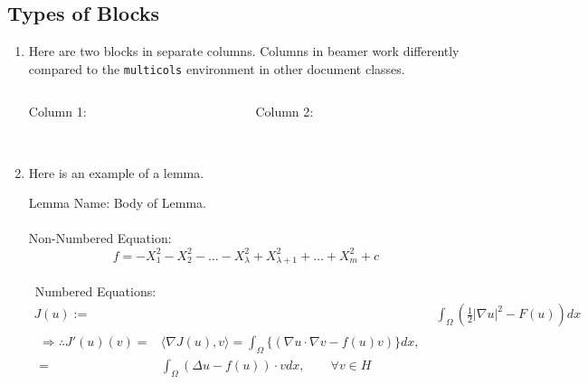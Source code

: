 \subsection{Types of Blocks}
\begin{frame}[fragile]
\begin{enumerate}
    \item Here are two blocks in separate columns. Columns in beamer work differently compared to the \verb+multicols+ environment in other document classes.
    \begin{columns}
    \begin{column}{0.48\textwidth}
    \begin{block}{Column 1:}
    {\gray \lipsum[2][1-6]}
\\~\ %
    \end{block}
    \end{column}
    \begin{column}{0.48\textwidth}
    \begin{block}{Column 2:}
    {\gray \lipsum[1][1-6]}
\\~\ %
    \end{block}
    \end{column}
    \end{columns}
\end{enumerate}
\end{frame}


\begin{frame}
\begin{enumerate}
        \setcounter{enumi}{1}
        \item Here is an example of a lemma.
        \\
\begin{lemma}
\label{lemmaA}
    \alert{Lemma Name:} Body of Lemma.\\~\ 
    \\ Non-Numbered Equation:
    \begin{equation*}
    f = -X_1^2-X_2^2-\dots-X_\lambda^2+X_{\lambda+1}^2+\dots+X_m^2+c    
    \end{equation*}
    ~\\\ Numbered Equations:
    \begin{align}
    J(u):=&\int_\Omega \left( \frac{1}{2} \lvert \nabla u \rvert ^2 - F(u) \right)dx\\
    \begin{split}
        \Rightarrow\therefore J'(u)(v)=&\langle\nabla J(u),v\rangle =\int_\Omega\{(\nabla u\cdot\nabla v -f(u)v)\}dx, \\
        =&\int_\Omega(\Delta u -f(u))\cdot vdx,\qquad \forall v \in H 
    \end{split}
    \end{align}
\end{lemma}
\end{enumerate}
\end{frame}


